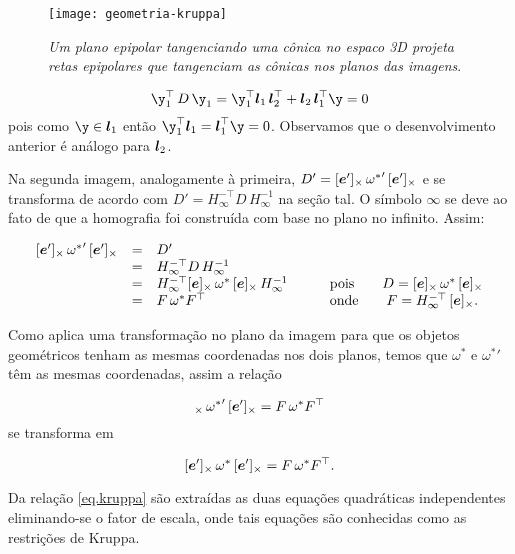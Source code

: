 \begin{figure}[!htb]
\centering
\texttt{[image: geometria-kruppa]}
\caption{\textit{Um plano epipolar tangenciando uma cônica no espaco 3D projeta retas epipolares que tangenciam as cônicas nos planos das imagens}.}
\label{geometria-kruppa}
\end{figure}


\begin{equation*}
\y_1^\top\,D\,\y_1=\y_1^\top \lightrgb_1\,\lightrgb_2^\top + \lightrgb_2\,\lightrgb_1^\top\y=0
\end{equation*}
pois como $\y\in\lightrgb_1$ então $\y_1^\top \lightrgb_1=\lightrgb_1^\top\y=0$. Observamos que o desenvolvimento anterior é análogo para $\boldsymbol{l}_2$.

Na segunda imagem, analogamente à primeira, $D'=[\boldsymbol{e}']_\times\,{{\bf \omega}^*}'\,[\boldsymbol{e}']_\times$ e se transforma de acordo com $D'=H_\infty^{-\top}D\,H_\infty^{-1}$ na seção tal. O símbolo $\infty$ se deve ao fato de que a homografia foi construída com base no plano no infinito. Assim:

\begin{equation}
\begin{array}{rcll}
[\boldsymbol{e}']_\times\,{{\bf \omega}^*}'\,[\boldsymbol{e}']_\times&=&D'&\\
&=&H_\infty^{-\top}D\,H_\infty^{-1}&\\
&=&H_\infty^{-\top}[\boldsymbol{e}]_\times\,{\bf \omega}^*\,[\boldsymbol{e}]_\times\,H_\infty^{-1}&\qquad\text{pois}\qquad D=[\boldsymbol{e}]_\times\,{\bf \omega}^*\,[\boldsymbol{e}]_\times\\
&=&F\,\omega^* F^\top&\qquad\text{onde}\qquad F=H_\infty^{-\top}\,[\boldsymbol{e}]_\times.
\end{array}
\end{equation}

Como \cite{2503343} aplica uma transformação no plano da imagem para que os objetos geométricos tenham as mesmas coordenadas nos dois planos, temos que $\omega^*$ e ${\omega^*}'$ têm as mesmas coordenadas, assim a relação

\begin{equation*}
[\e']_\times\,{{\bf \omega}^*}'\,[\e']_\times=F\,\omega^* F^\top
\end{equation*}
se transforma em 

\begin{equation}\label{eq.kruppa}
[\boldsymbol{e}']_\times\,{\bf \omega}^*\,[\boldsymbol{e}']_\times=F\,\omega^* F^\top.
\end{equation}



Da relação \ref{eq.kruppa} são extraídas as duas equações quadráticas independentes eliminando-se o fator de escala, onde tais equações são conhecidas como as restrições de Kruppa. 




